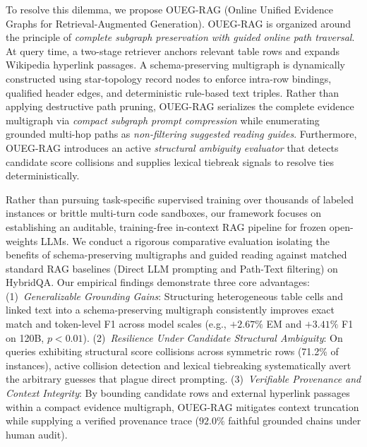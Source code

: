 \documentclass[runningheads]{llncs}
\begin{document}
To resolve this dilemma, we propose OUEG-RAG (Online Unified Evidence Graphs for Retrieval-Augmented Generation). OUEG-RAG is organized around the principle of \emph{complete subgraph preservation with guided online path traversal}. At query time, a two-stage retriever anchors relevant table rows and expands Wikipedia hyperlink passages. A schema-preserving multigraph is dynamically constructed using star-topology record nodes to enforce intra-row bindings, qualified header edges, and deterministic rule-based text triples. Rather than applying destructive path pruning, OUEG-RAG serializes the complete evidence multigraph via \emph{compact subgraph prompt compression} while enumerating grounded multi-hop paths as \emph{non-filtering suggested reading guides}. Furthermore, OUEG-RAG introduces an active \emph{structural ambiguity evaluator} that detects candidate score collisions and supplies lexical tiebreak signals to resolve ties deterministically.

Rather than pursuing task-specific supervised training over thousands of labeled instances or brittle multi-turn code sandboxes, our framework focuses on establishing an auditable, training-free in-context RAG pipeline for frozen open-weights LLMs. We conduct a rigorous comparative evaluation isolating the benefits of schema-preserving multigraphs and guided reading against matched standard RAG baselines (Direct LLM prompting and Path-Text filtering) on HybridQA. Our empirical findings demonstrate three core advantages:
(1)~\emph{Generalizable Grounding Gains}: Structuring heterogeneous table cells and linked text into a schema-preserving multigraph consistently improves exact match and token-level F1 across model scales (e.g., $+2.67\%$ EM and $+3.41\%$ F1 on 120B, $p < 0.01$).
(2)~\emph{Resilience Under Candidate Structural Ambiguity}: On queries exhibiting structural score collisions across symmetric rows (71.2\% of instances), active collision detection and lexical tiebreaking systematically avert the arbitrary guesses that plague direct prompting.
(3)~\emph{Verifiable Provenance and Context Integrity}: By bounding candidate rows and external hyperlink passages within a compact evidence multigraph, OUEG-RAG mitigates context truncation while supplying a verified provenance trace ($92.0\%$ faithful grounded chains under human audit).
\end{document}
